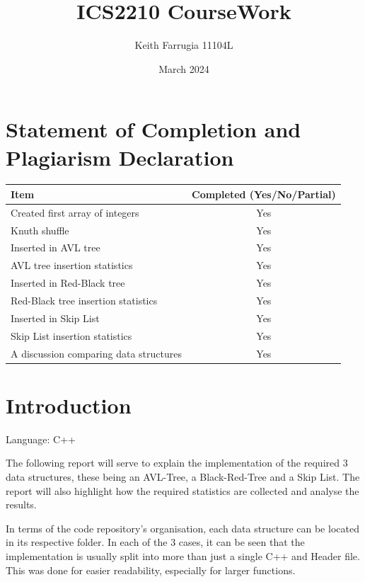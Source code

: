\documentclass[12pt, a4paper]{report}
\title{ICS2210 CourseWork}
\author{Keith Farrugia 11104L}
\date{March 2024}
\begin{document}
\maketitle

\tableofcontents

\chapter{Statement of Completion and Plagiarism Declaration}

\begin{center}
\begin{tabular}{ | p{} | c | } 
    \hline
    \textbf{Item} & \textbf{Completed (Yes/No/Partial)} \\ 
    \hline
    Created first array of integers & Yes \\ 
    \hline
    Knuth shuffle & Yes \\ 
    \hline
    Inserted in AVL tree & Yes \\ 
    \hline
    AVL tree insertion statistics & Yes \\ 
    \hline
    Inserted in Red-Black tree & Yes \\ 
    \hline
    Red-Black tree insertion statistics & Yes \\ 
    \hline
    Inserted in Skip List & Yes \\ 
    \hline
    Skip List insertion statistics & Yes \\ 
    \hline
    A discussion comparing data structures & Yes \\ 
    \hline
\end{tabular}
\end{center}




\chapter{Introduction}
Language: C++

The following report will serve to explain the implementation of the required 3 data structures, these being an AVL-Tree, a Black-Red-Tree and a Skip List. The report will also highlight how the required statistics are collected and analyse the results. 

In terms of the code repository's organisation, each data structure can be located in its respective folder. In each of the 3 cases, it can be seen that the implementation is usually split into more than just a single C++ and Header file. This was done for easier readability, especially for larger functions.
\end{document}
